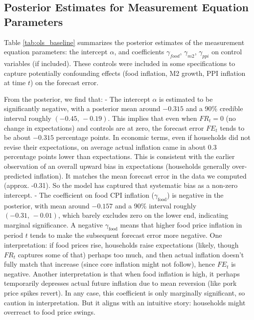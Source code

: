 \documentclass[12pt]{article}
\begin{document}
\subsection{Posterior Estimates for Measurement Equation Parameters}
Table \ref{tab:ols_baseline} summarizes the posterior estimates of the measurement equation parameters: the intercept $\alpha$, and coefficients $\gamma_{food}$, $\gamma_{m2}$, $\gamma_{ppi}$ on control variables (if included). These controls were included in some specifications to capture potentially confounding effects (food inflation, M2 growth, PPI inflation at time $t$) on the forecast error.

From the posterior, we find that:
- The intercept $\alpha$ is estimated to be significantly negative, with a posterior mean around $-0.315$ and a 90\% credible interval roughly $(-0.45,\,-0.19)$. This implies that even when $FR_t = 0$ (no change in expectations) and controls are at zero, the forecast error $FE_t$ tends to be about $-0.315$ percentage points. In economic terms, even if households did not revise their expectations, on average actual inflation came in about 0.3 percentage points lower than expectations. This is consistent with the earlier observation of an overall upward bias in expectations (households generally over-predicted inflation). It matches the mean forecast error in the data we computed (approx. -0.31). So the model has captured that systematic bias as a non-zero intercept.
- The coefficient on food CPI inflation ($\gamma_{\text{food}}$) is negative in the posterior, with mean around $-0.157$ and a 90\% interval roughly $(-0.31,\,-0.01)$, which barely excludes zero on the lower end, indicating marginal significance. A negative $\gamma_{\text{food}}$ means that higher food price inflation in period $t$ tends to make the subsequent forecast error more negative. One interpretation: if food prices rise, households raise expectations (likely, though $FR_t$ captures some of that) perhaps too much, and then actual inflation doesn't fully match that increase (since core inflation might not follow), hence $FE_t$ is negative. Another interpretation is that when food inflation is high, it perhaps temporarily depresses actual future inflation due to mean reversion (like pork price spikes revert). In any case, this coefficient is only marginally significant, so caution in interpretation. But it aligns with an intuitive story: households might overreact to food price swings.
\end{document}
